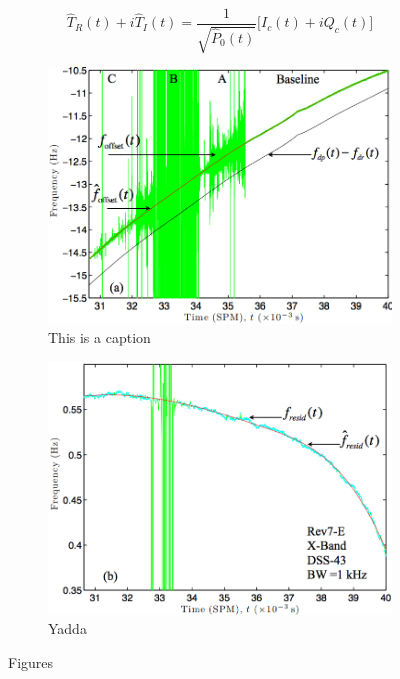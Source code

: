 \documentclass[oneside]{book}
\theoremstyle{mystyle}
\begin{document}
\begin{equation}
\hat{T}_{R}(t) + i\hat{T}_{I}(t) = \frac{1}{\sqrt{\hat{P}_{0}(t)}}\big[I_{c}(t) + iQ_{c}(t)\big]
\end{equation}
\begin{figure}[htbp]
	\centering
	\begin{subfigure}[b]{0.49\textwidth}
    	\includegraphics[width=\textwidth]{USER_8.png}
    	\caption{This is a caption}
    \end{subfigure}
    \begin{subfigure}[b]{0.49\textwidth}
        \includegraphics[width=\textwidth]{USER_8a.png}
        \caption{Yadda}
    \end{subfigure}
    \caption{Figures}
    \label{other_label}
\end{figure}
\end{document}
